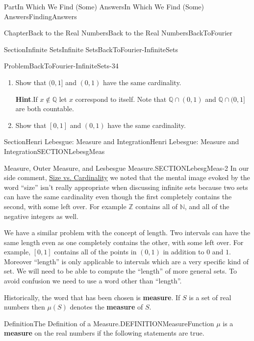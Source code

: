 \documentclass[oneside,10pt,]{book}
\newcommand{\blocktitlefont}{\relax}
\newcommand{\terminology}[1]{\textbf{#1}}
\numberwithin{equation}{part}
\newcommand{\QQ}{\mathbb {Q}}
\newcommand{\NN}{\mathbb {N}}
\newcommand{\ZZ}{\mathbb {Z}}
\begin{document}
\begin{partptx}{Part}{In Which We Find (Some) Answers}{}{In Which We Find (Some) Answers}{}{}{FindingAnswers}
\begin{chapterptx}{Chapter}{Back to the Real Numbers}{}{Back to the Real Numbers}{}{}{BackToFourier}
\begin{sectionptx}{Section}{Infinite Sets}{}{Infinite Sets}{}{}{BackToFourier-InfiniteSets}
\begin{problem}{Problem}{}{BackToFourier-InfiniteSets-34}
\begin{enumerate}[font=\bfseries,label=(\alph*),ref=\alph*]
\noindent\textbf{\blocktitlefont Hint}.\hypertarget{BackToFourier-InfiniteSets-34-3-2}{}\quad{}Consider the interval \((-\pi/2,\pi/2)\).%
\item{}Show that \((0,1]\) and \((0,1)\) have the same cardinality.%
\par\smallskip%
\noindent\textbf{\blocktitlefont Hint}.\hypertarget{BackToFourier-InfiniteSets-34-4-2}{}\quad{}If \(x\not\in \QQ{}\) let \(x\) correspond to itself. Note that  \(\QQ \cap (0,1)\) and \(\QQ
\cap (0,1]\) are both countable.   %
\item{}Show that \([0,1]\) and \((0,1)\) have the same cardinality.%
\end{enumerate}%
\end{problem}
\end{sectionptx}
%
%
\typeout{************************************************}
\typeout{************************************************}
%
\begin{sectionptx}{Section}{Henri Lebesgue: Measure and Integration}{}{Henri Lebesgue: Measure and Integration}{}{}{SECTIONLebesgMeas}
\begin{paragraphs}{Measure, Outer Measure, and  Lesbesgue Measure.}{SECTIONLebesgMeas-2}%
In our side comment, \hyperref[SizeVsCardinality]{Size vs. Cardinality} we noted that the mental image evoked by the word ``size'' isn't really appropriate when discussing infinite sets because two sets can have the same cardinality even though the first completely contains the second, with some left over. For example \(\ZZ \) contains all of \(\NN{}\), and all of the negative integers as well.%
\par
We have a similar problem with the concept of length. Two intervals can have the same length even as one completely contains the other, with some left over. For example, \([0,1]\) contains all of the points in \((0,1)\) in addition to \(0\) and \(1\). Moreover ``length'' is only applicable to intervals which are a very specific kind of set.  We will need to be able to compute the ``length'' of more general sets. To avoid confusion we need to use a word other than ``length''.%
\par
Historically,  the word that has been chosen  is \terminology{measure}. If \(S\) is a set of real numbers then \(\mu
(S)\) denotes the \terminology{measure} of \(S\).%
\begin{definition}{Definition}{The Definition of a Measure.}{DEFINITIONMeasureFunction}%
\(\mu \) is a \terminology{measure} on the real numbers if the following statements are true.%

\end{definition}
\end{paragraphs}
\end{sectionptx}
\end{chapterptx}
\end{partptx}
\end{document}
